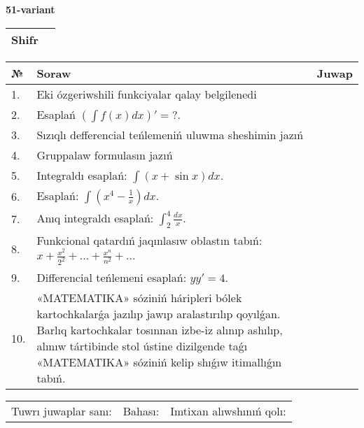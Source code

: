 \documentclass{article}
\begin{document}
  \egroup
  
  \newpage
  
  
  \textbf{51-variant}\\
  
  \bgroup
  \def\arraystretch{1.6} %
  
  \begin{tabular}{|m{5.7cm}|m{9.5cm}|}
  \hline
  Shifr & \\
  \hline
  \end{tabular}
  
  \vspace{1cm}
  
  \begin{tabular}{|m{0.7cm}|m{10cm}|m{4cm}|}
  \hline
  № & Soraw & Juwap \\
  \hline
  1. & Eki ózgeriwshili funkciyalar qalay belgilenedi &  \\
  \hline
  2. & Esaplań \(\left( \int{f(x)dx} \right)' = ?\). &  \\
  \hline
  3. & Sızıqlı defferencial teńlemeniń uluwma sheshimin jazıń &  \\
  \hline
  4. & Gruppalaw formulasın jazıń &  \\
  \hline
  5. & Integraldı esaplań: \(\int{(x + \sin x)dx}\). &  \\
  \hline
  6. & Esaplań: \(\int\left( x^{4} - \frac{1}{x} \right)dx\). &  \\
  \hline
  7. & Anıq integraldı esaplań: \(\int_{2}^{4}\frac{dx}{x}\). &  \\
  \hline
  8. & Funkcional qatardıń jaqınlasıw oblastın tabıń: \(x + \frac{x^2 }{2^2 } + ... + \frac{x^{n}}{n^2 } + ...\) &  \\
  \hline
  9. & Differencial teńlemeni esaplań: \(yy' = 4\). &  \\
  \hline
  10. & «MATEMATIKA» sóziniń háripleri bólek kartochkalarǵa jazılıp jawıp aralastırılıp qoyılǵan. Barlıq kartochkalar tosınnan izbe-iz alınıp ashılıp, alınıw tártibinde stol ústine dizilgende taǵı «MATEMATIKA» sóziniń kelip shıǵıw itimallıǵın tabıń. &  \\
  \hline
  \end{tabular}
  
  \vspace{1cm}
  
  \begin{tabular}{lll}
  Tuwrı juwaplar sanı: \underline{\hspace{1.5cm}} & 
  Bahası: \underline{\hspace{1.5cm}} & 
  Imtixan alıwshınıń qolı: \underline{\hspace{2cm}} \\
  \end{tabular}
  
\end{document}
